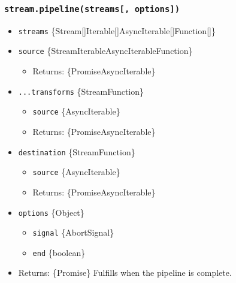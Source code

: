\subsubsection{\texorpdfstring{\texttt{stream.pipeline(streams{[},\ options{]})}}{stream.pipeline(streams{[}, options{]})}}\label{stream.pipelinestreams-options}

\begin{itemize}
\tightlist
\item
  \texttt{streams}
  \{Stream{[}{]}\textbar Iterable{[}{]}\textbar AsyncIterable{[}{]}\textbar Function{[}{]}\}
\item
  \texttt{source}
  \{Stream\textbar Iterable\textbar AsyncIterable\textbar Function\}

  \begin{itemize}
  \tightlist
  \item
    Returns: \{Promise\textbar AsyncIterable\}
  \end{itemize}
\item
  \texttt{...transforms} \{Stream\textbar Function\}

  \begin{itemize}
  \tightlist
  \item
    \texttt{source} \{AsyncIterable\}
  \item
    Returns: \{Promise\textbar AsyncIterable\}
  \end{itemize}
\item
  \texttt{destination} \{Stream\textbar Function\}

  \begin{itemize}
  \tightlist
  \item
    \texttt{source} \{AsyncIterable\}
  \item
    Returns: \{Promise\textbar AsyncIterable\}
  \end{itemize}
\item
  \texttt{options} \{Object\}

  \begin{itemize}
  \tightlist
  \item
    \texttt{signal} \{AbortSignal\}
  \item
    \texttt{end} \{boolean\}
  \end{itemize}
\item
  Returns: \{Promise\} Fulfills when the pipeline is complete.
\end{itemize}

